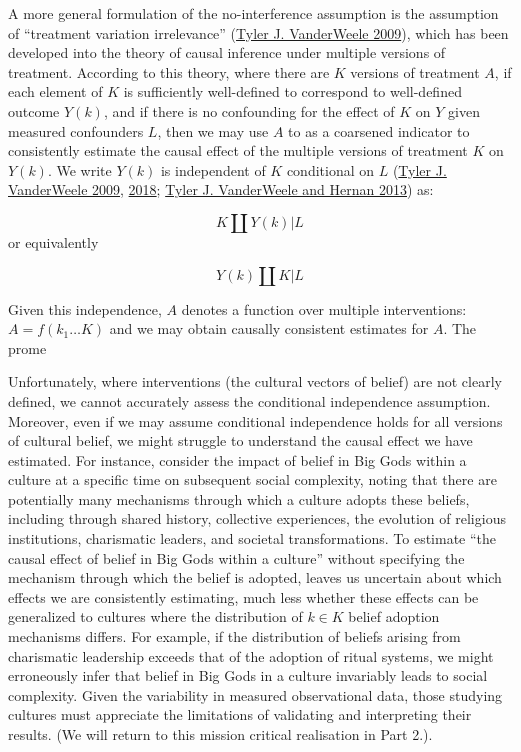 \documentclass[
  singlecolumn]{report}
\begin{document}
A more general formulation of the no-interference assumption is the
assumption of ``treatment variation irrelevance''
(\protect\hyperlink{ref-vanderweele2009}{Tyler J. VanderWeele 2009}),
which has been developed into the theory of causal inference under
multiple versions of treatment. According to this theory, where there
are \(K\) versions of treatment \(A\), if each element of \(K\) is
sufficiently well-defined to correspond to well-defined outcome
\(Y(k)\), and if there is no confounding for the effect of \(K\) on
\(Y\) given measured confounders \(L\), then we may use \(A\) to as a
coarsened indicator to consistently estimate the causal effect of the
multiple versions of treatment \(K\) on \(Y(k)\). We write \(Y(k)\) is
independent of \(K\) conditional on \(L\)
(\protect\hyperlink{ref-vanderweele2009}{Tyler J. VanderWeele 2009},
\protect\hyperlink{ref-vanderweele2018}{2018};
\protect\hyperlink{ref-vanderweele2013}{Tyler J. VanderWeele and Hernan
2013}) as:

\[K \coprod Y(k) | L\] or equivalently

\[Y(k) \coprod K | L\]

Given this independence, \(A\) denotes a function over multiple
interventions: \(A = f(k_1\dots K)\) and we may obtain causally
consistent estimates for \(A\). The prome

Unfortunately, where interventions (the cultural vectors of belief) are
not clearly defined, we cannot accurately assess the conditional
independence assumption. Moreover, even if we may assume conditional
independence holds for all versions of cultural belief, we might
struggle to understand the causal effect we have estimated. For
instance, consider the impact of belief in Big Gods within a culture at
a specific time on subsequent social complexity, noting that there are
potentially many mechanisms through which a culture adopts these
beliefs, including through shared history, collective experiences, the
evolution of religious institutions, charismatic leaders, and societal
transformations. To estimate ``the causal effect of belief in Big Gods
within a culture'' without specifying the mechanism through which the
belief is adopted, leaves us uncertain about which effects we are
consistently estimating, much less whether these effects can be
generalized to cultures where the distribution of \(k \in K\) belief
adoption mechanisms differs. For example, if the distribution of beliefs
arising from charismatic leadership exceeds that of the adoption of
ritual systems, we might erroneously infer that belief in Big Gods in a
culture invariably leads to social complexity. Given the variability in
measured observational data, those studying cultures must appreciate the
limitations of validating and interpreting their results. (We will
return to this mission critical realisation in Part 2.).
\end{document}
